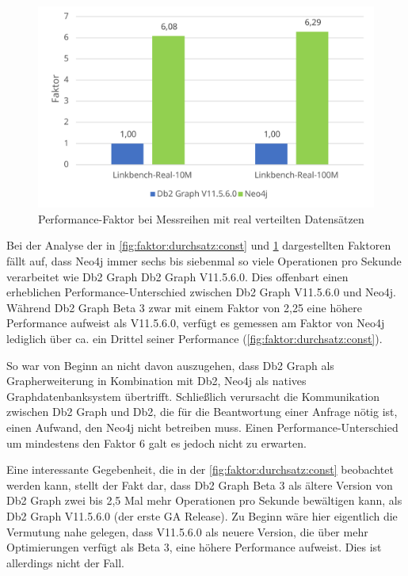 \begin{figure}[!ht]
    \centering
    \includegraphics[width=\textwidth]{images/diagramme/faktor_durchschittlicher_durchsatz_real.pdf}
    \caption{Performance-Faktor bei Messreihen mit real verteilten Datensätzen}
    \label{fig:faktor:durchsatz:real}
\end{figure}

Bei der Analyse der in \autoref{fig:faktor:durchsatz:const} und \ref{fig:faktor:durchsatz:real} dargestellten Faktoren fällt auf, dass Neo4j immer sechs bis siebenmal so viele Operationen pro Sekunde verarbeitet wie Db2 Graph Db2 Graph V11.5.6.0. Dies offenbart einen erheblichen Performance-Unterschied zwischen Db2 Graph V11.5.6.0 und Neo4j. Während Db2 Graph Beta 3 zwar mit einem Faktor von 2,25 eine höhere Performance aufweist als V11.5.6.0, verfügt es gemessen am Faktor von Neo4j lediglich über ca. ein Drittel seiner Performance (\autoref{fig:faktor:durchsatz:const}).  

So war von Beginn an nicht davon auszugehen, dass Db2 Graph als Grapherweiterung in Kombination mit Db2, Neo4j als natives Graphdatenbanksystem übertrifft. Schließlich verursacht die Kommunikation zwischen Db2 Graph und Db2, die für die Beantwortung einer Anfrage nötig ist, einen Aufwand, den Neo4j nicht betreiben muss. Einen Performance-Unterschied um mindestens den Faktor 6 galt es jedoch nicht zu erwarten. 

Eine interessante Gegebenheit, die in der \autoref{fig:faktor:durchsatz:const} beobachtet werden kann, stellt der Fakt dar, dass Db2 Graph Beta 3 als ältere Version von Db2 Graph zwei bis 2,5 Mal mehr Operationen pro Sekunde bewältigen kann, als Db2 Graph V11.5.6.0 (der erste GA Release). Zu Beginn wäre hier eigentlich die Vermutung nahe gelegen, dass V11.5.6.0 als neuere Version, die über mehr Optimierungen verfügt als Beta 3, eine höhere Performance aufweist. Dies ist allerdings nicht der Fall. 

